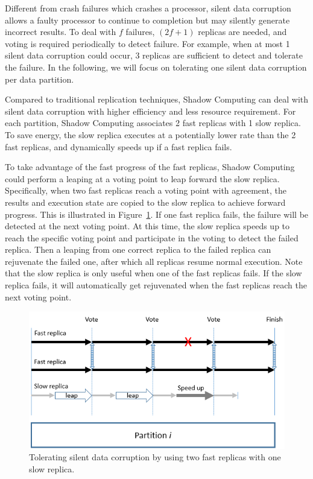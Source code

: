 Different from crash failures which crashes a processor, silent data corruption allows a faulty processor to continue to completion but may silently generate incorrect results. To deal with $f$ failures, $(2f+1)$ replicas are needed, and voting is required periodically to detect failure. For example, when at most 1 silent data corruption could occur, 3 replicas are sufficient to detect and tolerate the failure. In the following, we will focus on tolerating one silent data corruption per data partition. 

Compared to traditional replication techniques, Shadow Computing can deal with silent data corruption with higher efficiency and less resource requirement. For each partition, Shadow Computing associates 2 fast replicas with 1 slow replica. To save energy, the slow replica executes at a potentially lower rate than the 2 fast replicas, and dynamically speeds up if a fast replica fails. 

To take advantage of the fast progress of the fast replicas, Shadow Computing could perform a leaping at a voting point to leap forward the slow replica. Specifically, when two fast replicas reach a voting point with agreement, the results and execution state are copied to the slow replica to achieve forward progress. This is illustrated in Figure~\ref{fig:silent_model}. If one fast replica fails, the failure will be detected at the next voting point. At this time, the slow replica speeds up to reach the specific voting point and participate in the voting to detect the failed replica. Then a leaping from one correct replica to the failed replica can rejuvenate the failed one, after which all replicas resume normal execution. Note that the slow replica is only useful when one of the fast replicas fails. If the slow replica fails, it will automatically get rejuvenated when the fast replicas reach the next voting point. 

\begin{figure}[!t]
  \begin{center}
      \includegraphics[width=\columnwidth]{figures/silent_model}
  \end{center}
  \vskip -0.1in
  \caption{Tolerating silent data corruption by using two fast replicas with one slow replica.}
  \label{fig:silent_model}
\end{figure}

